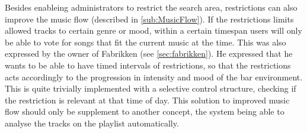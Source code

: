 Besides enableing administrators to restrict the search area, restrictions can also improve the music flow (described in \cref{sub:MusicFlow}). If the restrictions limits allowed tracks to certain genre or mood, within a certain timespan users will only be able to vote for songs that fit the current music at the time. This was also expressed by the owner of Fabrikken (see \cref{sec:fabrikken}). He expressed that he wants to be able to have timed intervals of restrictions, so that the restrictions acts accordingly to the progression in intensity and mood of the bar environment. This is quite trivially implemented with a selective control structure, checking if the restriction is relevant at that time of day. This solution to improved music flow should only be supplement to another concept, the system being able to analyse the tracks on the playlist automatically.